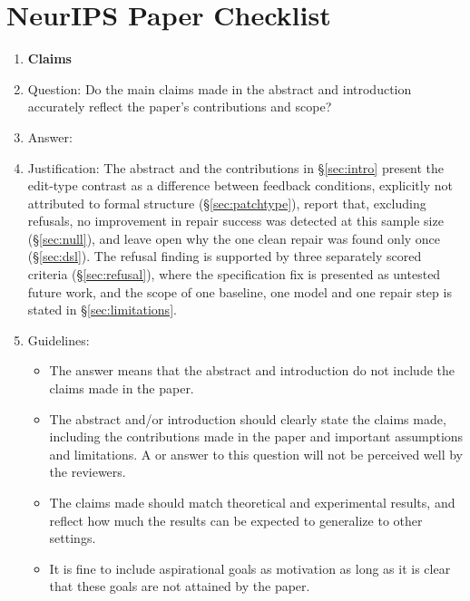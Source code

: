 
\clearpage
\section*{NeurIPS Paper Checklist}

\begin{enumerate}

\item {\bf Claims}
    \item[] Question: Do the main claims made in the abstract and introduction accurately reflect the paper's contributions and scope?
    \item[] Answer: \answerYes{}
    \item[] Justification: The abstract and the contributions in \S\ref{sec:intro} present the edit-type contrast as a difference between feedback conditions, explicitly not attributed to formal structure (\S\ref{sec:patchtype}), report that, excluding refusals, no improvement in repair success was detected at this sample size (\S\ref{sec:null}), and leave open why the one clean repair was found only once (\S\ref{sec:dsl}). The refusal finding is supported by three separately scored criteria (\S\ref{sec:refusal}), where the specification fix is presented as untested future work, and the scope of one baseline, one model and one repair step is stated in \S\ref{sec:limitations}.
    \item[] Guidelines:
    \begin{itemize}
        \item The answer \answerNA{} means that the abstract and introduction do not include the claims made in the paper.
        \item The abstract and/or introduction should clearly state the claims made, including the contributions made in the paper and important assumptions and limitations. A \answerNo{} or \answerNA{} answer to this question will not be perceived well by the reviewers.
        \item The claims made should match theoretical and experimental results, and reflect how much the results can be expected to generalize to other settings.
        \item It is fine to include aspirational goals as motivation as long as it is clear that these goals are not attained by the paper.
    \end{itemize}


\end{enumerate}
